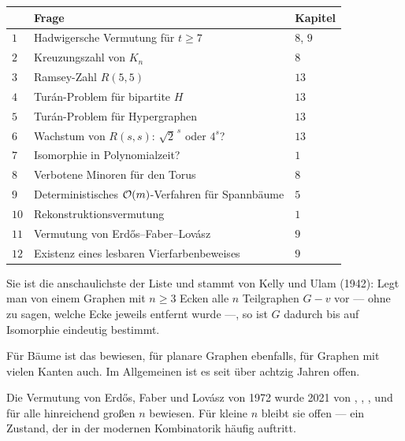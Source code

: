 \begin{merksatz}
\begin{center}
{\small
\renewcommand{\arraystretch}{1.42}
\begin{tabular}{@{}P{0.7cm}P{5.2cm}P{2.2cm}@{}}
\toprule
& \textbf{Frage} & \textbf{Kapitel}\\
\midrule
$1$ & Hadwigersche Vermutung für $t \ge 7$ & $8$, $9$\\
$2$ & Kreuzungszahl von $K_n$ & $8$\\
$3$ & Ramsey-Zahl $R(5,5)$ & $13$\\
$4$ & Turán-Problem für bipartite $H$ & $13$\\
$5$ & Turán-Problem für Hypergraphen & $13$\\
$6$ & Wachstum von $R(s,s)$: $\sqrt2^{\,s}$ oder $4^s$? & $13$\\
$7$ & Isomorphie in Polynomialzeit? & $1$\\
$8$ & Verbotene Minoren für den Torus & $8$\\
$9$ & Deterministisches $\mathcal{O}(m)$-Verfahren für Spannbäume & $5$\\
$10$ & Rekonstruktionsvermutung & $1$\\
$11$ & Vermutung von Erdős--Faber--Lovász & $9$\\
$12$ & Existenz eines lesbaren Vierfarbenbeweises & $9$\\
\bottomrule
\end{tabular}}
\end{center}

Sie ist die anschaulichste der Liste und stammt von Kelly und Ulam (1942): Legt man von einem Graphen mit $n \ge 3$ Ecken alle $n$ Teilgraphen $G - v$ vor --- ohne zu sagen, welche Ecke jeweils entfernt wurde ---, so ist $G$ dadurch bis auf Isomorphie eindeutig bestimmt.

Für Bäume ist das bewiesen, für planare Graphen ebenfalls, für Graphen mit vielen Kanten auch. Im Allgemeinen ist es seit über achtzig Jahren offen.

Die Vermutung von Erdős, Faber und Lovász von 1972 wurde 2021 von , , ,  und  für alle hinreichend großen $n$ bewiesen. Für kleine $n$ bleibt sie offen --- ein Zustand, der in der modernen Kombinatorik häufig auftritt.
\end{merksatz}

